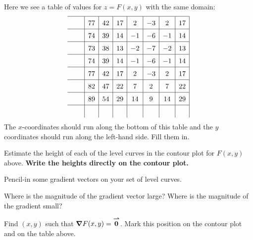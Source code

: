 \documentclass[handout,noauthor,nooutcomes]{ximera}
\begin{document}
\begin{problem}
Here we see a table of values for $z= F(x,y)$ with the same domain:
\[
\renewcommand*{\arraystretch}{1.5}
\begin{array}{c|c|c|c|c|c|c|c|}\hline
\rule{.5cm}{0cm} & 77 & 42 & 17 & 2 & -3 & 2 & 17 \\ \hline
 & 74 & 39 & 14 & -1 & -6 & -1 & 14 \\ \hline
 & 73 & 38 & 13 & -2 & -7 & -2 & 13 \\ \hline
 & 74 & 39 & 14 & -1 & -6 & -1 & 14 \\ \hline
 & 77 & 42 & 17 & 2 & -3 & 2 & 17 \\ \hline
 & 82 & 47 & 22 & 7 & 2 & 7 & 22 \\ \hline
 & 89 & 54 & 29 & 14 & 9 & 14 & 29 \\ \hline
 &    &    &    &    &   &    & 
\end{array}
\]
The $x$-coordinates should run along the bottom of this table and the
$y$ coordinates should run along the left-hand side. Fill them in.
\end{problem}

\begin{problem}
Estimate the height of each of the level curves in the contour plot
for $F(x,y)$ above. \textbf{Write the heights directly on the contour
  plot.}
\end{problem}

\begin{problem}
  Pencil-in some gradient vectors on your set of level curves. 
\end{problem}


\begin{problem}
  Where is the magnitude of the gradient vector large? Where is the
  magnitude of the gradient small?
\end{problem}


\begin{problem}
Find $(x,y)$ such that $\boldsymbol\nabla F(x,y) = {\overset{\boldsymbol{\rightharpoonup}}{\mathbf{0}}}$. Mark this position on the
contour plot and on the table above. %
\end{problem}





\end{document}
